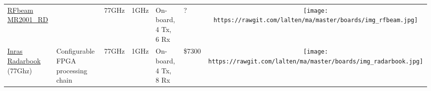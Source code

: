 \begin{longtable}[]{@{}llllllc@{}}
\begin{minipage}[t]{0.09\columnwidth}\raggedright\strut
	\href{https://www.rfbeam.ch/files/products/26/downloads/ProductBrief_MR2001_RD.pdf}{RFbeam MR2001\_RD}
\strut\end{minipage} &
\begin{minipage}[t]{0.13\columnwidth}\raggedright\strut

\strut\end{minipage} &
\begin{minipage}[t]{0.09\columnwidth}\raggedright\strut
77GHz
\strut\end{minipage} &
\begin{minipage}[t]{0.11\columnwidth}\raggedright\strut
1GHz
\strut\end{minipage} &
\begin{minipage}[t]{0.10\columnwidth}\raggedright\strut
On-board, 4 Tx, 6 Rx
\strut\end{minipage} &
\begin{minipage}[t]{0.15\columnwidth}\raggedright\strut
?
\strut\end{minipage} &
\begin{minipage}[t]{0.10\columnwidth}\centering\strut
\texttt{[image: https://rawgit.com/lalten/ma/master/boards/img\_rfbeam.jpg]}
\strut\end{minipage}\tabularnewline

\begin{minipage}[t]{0.09\columnwidth}\raggedright\strut
\href{http://www.inras.at/en/products/radarbook.html}{Inras Radarbook} (77Ghz)
\strut\end{minipage} &
\begin{minipage}[t]{0.13\columnwidth}\raggedright\strut
Configurable FPGA processing chain
\strut\end{minipage} &
\begin{minipage}[t]{0.09\columnwidth}\raggedright\strut
77GHz
\strut\end{minipage} &
\begin{minipage}[t]{0.11\columnwidth}\raggedright\strut
1GHz
\strut\end{minipage} &
\begin{minipage}[t]{0.10\columnwidth}\raggedright\strut
On-board, 4 Tx, 8 Rx
\strut\end{minipage} &
\begin{minipage}[t]{0.15\columnwidth}\raggedright\strut
\$7300
\strut\end{minipage} &
\begin{minipage}[t]{0.10\columnwidth}\centering\strut
\texttt{[image: https://rawgit.com/lalten/ma/master/boards/img\_radarbook.jpg]}
\strut\end{minipage}\tabularnewline


\end{longtable}
